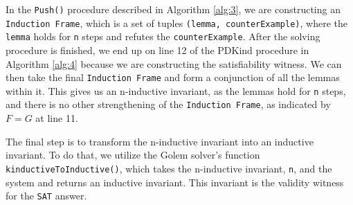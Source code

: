 In the \texttt{Push()} procedure described in Algorithm \ref{alg:3}, we are constructing an \texttt{Induction Frame}, which is a set of tuples \texttt{(lemma, counterExample)}, where the \texttt{lemma} holds for \texttt{n} steps and refutes the \texttt{counterExample}. After the solving procedure is finished, we end up on line 12 of the PDKind procedure in Algorithm \ref{alg:4} because we are constructing the satisfiability witness. We can then take the final \texttt{Induction Frame} and form a conjunction of all the lemmas within it. This gives us an n-inductive invariant, as the lemmas hold for \texttt{n} steps, and there is no other strengthening of the \texttt{Induction Frame}, as indicated by \( F = G \) at line 11.

The final step is to transform the n-inductive invariant into an inductive invariant. To do that, we utilize the Golem solver's function \texttt{kinductiveToInductive()}, which takes the n-inductive invariant, \texttt{n}, and the system and returns an inductive invariant. This invariant is the validity witness for the \texttt{SAT} answer.

